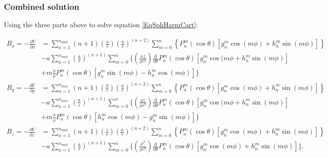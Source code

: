 \documentclass[]{article}
\begin{document}
		\subsubsection{Combined solution}	
			
			Using the three parts above to solve equation \ref{EqSphHarmCart}:
			
			\begin{align}
				B_x = -\frac{\partial V}{\partial x} &= \sum_{n=1}^{n_{max}} (n + 1)\left(\frac{x}{r}\right)\left(\frac{a}{r}\right)^{(n+2)} \sum_{m=0}^{n} \left\{ P_n^m(\cos{\theta}) \left[ g_n^m \cos{(m\phi)} + h_n^m \sin{(m\phi)}\right] \right\}    \nonumber \\
				&- a \sum_{n=1}^{n_{max}} \left(\frac{a}{r}\right)^{(n+1)} \sum_{m=0}^{n} \biggl\{ \left(\frac{xz}{\rho r^2}\right)\frac{\text{d}}{\text{d} \theta} P_n^m(\cos{\theta}) \left[g_n^m \cos{(m\phi} + h_n^m \sin{(m\phi)} \right] \nonumber \\
				&+ m\frac{y}{\rho} P_n^m(\cos{\theta}) \left[ g_n^m\sin{(m\phi)} - h_n^m \cos{(m\phi)}\right]  \biggr\} \\
				B_y = -\frac{\partial V}{\partial y} &= \sum_{n=1}^{n_{max}} (n + 1)\left(\frac{y}{r}\right)\left(\frac{a}{r}\right)^{(n+2)} \sum_{m=0}^{n} \left\{ P_n^m(\cos{\theta}) \left[ g_n^m \cos{(m\phi)} + h_n^m \sin{(m\phi)}\right] \right\}    \nonumber \\
				&- a \sum_{n=1}^{n_{max}} \left(\frac{a}{r}\right)^{(n+1)} \sum_{m=0}^{n} \biggl\{ \left(\frac{yz}{\rho r^2}\right)\frac{\text{d}}{\text{d} \theta} P_n^m(\cos{\theta}) \left[g_n^m \cos{(m\phi} + h_n^m \sin{(m\phi)} \right] \nonumber \\
				&+ m\frac{x}{\rho} P_n^m(\cos{\theta}) \left[ h_n^m \cos{(m\phi)} - g_n^m\sin{(m\phi)}\right]  \biggr\} \\
				B_z = -\frac{\partial V}{\partial z} &= \sum_{n=1}^{n_{max}} (n + 1)\left(\frac{z}{r}\right)\left(\frac{a}{r}\right)^{(n+2)} \sum_{m=0}^{n} \left\{ P_n^m(\cos{\theta}) \left[ g_n^m \cos{(m\phi)} + h_n^m \sin{(m\phi)}\right] \right\}    \nonumber \\
				&- a \sum_{n=1}^{n_{max}} \left(\frac{a}{r}\right)^{(n+1)} \sum_{m=0}^{n} \biggl\{ \left(\frac{\rho^2}{\rho r^3}\right)\frac{\text{d}}{\text{d} \theta} P_n^m(\cos{\theta}) \left[g_n^m \cos{(m\phi)} + h_n^m \sin{(m\phi)} \right]  \biggr\}.				
			\end{align}
			


\end{document}
